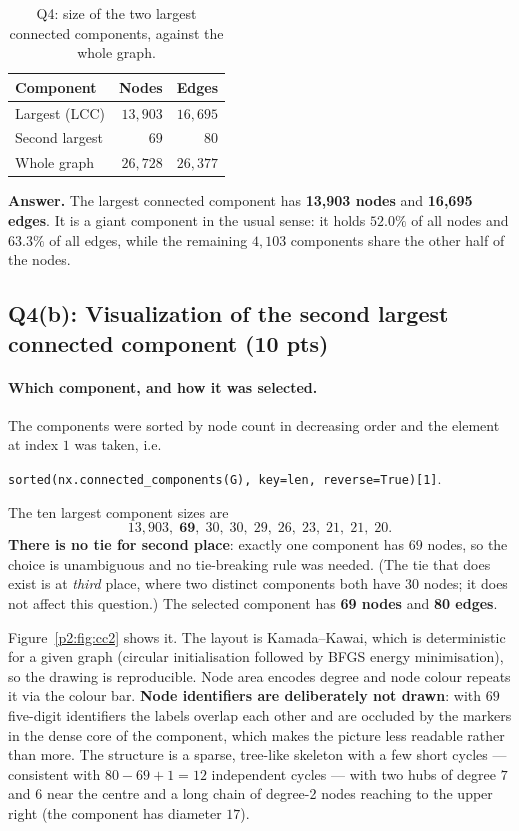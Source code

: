 \begin{table}[ht]
  \centering
  \begin{tabular}{lrr}
    \toprule
    Component & Nodes & Edges \\
    \midrule
    Largest (LCC)        & $13{,}903$ & $16{,}695$ \\
    Second largest       & $69$       & $80$       \\
    \midrule
    Whole graph          & $26{,}728$ & $26{,}377$ \\
    \bottomrule
  \end{tabular}
  \caption{Q4: size of the two largest connected components, against the whole
  graph.}
  \label{p2:tab:q4}
\end{table}

\noindent\textbf{Answer.} The largest connected component has
\textbf{13{,}903 nodes} and \textbf{16{,}695 edges}. It is a giant component in
the usual sense: it holds $52.0\%$ of all nodes and $63.3\%$ of all edges, while
the remaining $4{,}103$ components share the other half of the nodes.

\subsection*{Q4(b): Visualization of the second largest connected component (10 pts)}

\paragraph{Which component, and how it was selected.}
The components were sorted by node count in decreasing order and the element at
index $1$ was taken, i.e.
\begin{center}
\texttt{sorted(nx.connected\_components(G), key=len, reverse=True)[1]}.
\end{center}
The ten largest component sizes are
\[
  13{,}903,\; \mathbf{69},\; 30,\; 30,\; 29,\; 26,\; 23,\; 21,\; 21,\; 20 .
\]
\textbf{There is no tie for second place}: exactly one component has $69$ nodes,
so the choice is unambiguous and no tie-breaking rule was needed. (The tie that
does exist is at \emph{third} place, where two distinct components both have
$30$ nodes; it does not affect this question.) The selected component has
\textbf{69 nodes} and \textbf{80 edges}.

Figure~\ref{p2:fig:cc2} shows it. The layout is Kamada--Kawai, which is
deterministic for a given graph (circular initialisation followed by
BFGS energy minimisation), so the drawing is reproducible. Node area encodes
degree and node colour repeats it via the colour bar. \textbf{Node identifiers
are deliberately not drawn}: with $69$ five-digit identifiers the labels overlap
each other and are occluded by the markers in the dense core of the component,
which makes the picture less readable rather than more. The structure is a
sparse, tree-like skeleton with a few short cycles --- consistent with
$80-69+1 = 12$ independent cycles --- with two hubs of degree $7$ and $6$ near
the centre and a long chain of degree-2 nodes reaching to the upper right (the
component has diameter $17$).

